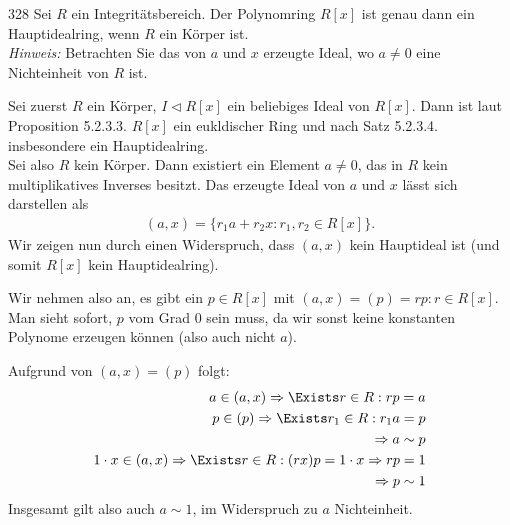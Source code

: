 \begin{algebraUE}{328}
Sei $R$ ein Integritätsbereich. Der Polynomring $R[x]$ ist genau dann ein
Hauptidealring, wenn $R$ ein Körper ist. \\
\textit{Hinweis:} Betrachten Sie das von $a$ und $x$ erzeugte Ideal, wo $a \neq 0$
eine Nichteinheit von $R$ ist.
\end{algebraUE}
\begin{solution}
Sei zuerst $R$ ein Körper, $I \vartriangleleft R[x]$ ein beliebiges Ideal von $R[x]$.
Dann ist laut Proposition 5.2.3.3. $R[x]$ ein eukldischer Ring und nach Satz 5.2.3.4.
insbesondere ein Hauptidealring. \\
Sei also $R$ kein Körper. Dann existiert ein Element $a \neq 0$, das in $R$ kein
multiplikatives Inverses besitzt. Das erzeugte Ideal von $a$ und $x$ lässt sich darstellen als
\begin{align*}
  (a,x) = \{r_1a + r_2x: r_1,r_2 \in R[x]\}.
\end{align*}
Wir zeigen nun durch einen Widerspruch, dass $(a,x)$ kein Hauptideal ist (und somit $R[x]$ kein Hauptidealring).

Wir nehmen also an, es gibt ein $p \in R[x]$ mit $(a,x) = (p) = {rp: r \in R[x]}$. Man sieht sofort, $p$ vom Grad $0$ sein muss, da wir sonst keine konstanten Polynome erzeugen können (also auch nicht $a$).

Aufgrund von $(a,x)=(p)$ folgt:
\begin{align*}
  a \in (a,x) \Rightarrow \Exists r \in R: rp = a \\
  p \in (p) \Rightarrow \Exists r_1 \in R: r_1 a = p \\
  \Rightarrow a \sim p \\
  1\cdot x \in (a,x) \Rightarrow \Exists r \in R: (rx)p = 1\cdot x \Rightarrow rp = 1 \\
  \Rightarrow p \sim 1
\end{align*}
Insgesamt gilt also auch $a \sim 1$, im Widerspruch zu $a$ Nichteinheit.
\end{solution}
